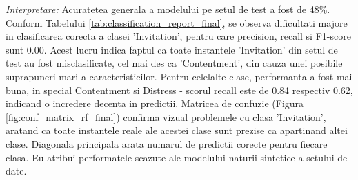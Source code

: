 \documentclass[11pt, a4paper]{article}
\begin{document}
\textit{Interpretare:} Acuratetea generala a modelului pe setul de test a fost de 48\%.
Conform Tabelului \ref{tab:classification_report_final}, se observa dificultati majore in clasificarea corecta a clasei 'Invitation', pentru care precision, recall si F1-score sunt 0.00. Acest lucru indica faptul ca toate instantele 'Invitation' din setul de test au fost misclasificate, cel mai des ca 'Contentment', din cauza unei posibile suprapuneri mari a caracteristicilor. Pentru celelalte clase, performanta a fost mai buna, in special Contentment si Distress - scorul recall este de 0.84 respectiv 0.62, indicand o incredere decenta in predictii.
Matricea de confuzie (Figura \ref{fig:conf_matrix_rf_final}) confirma vizual problemele cu clasa 'Invitation', aratand ca toate instantele reale ale acestei clase sunt prezise ca apartinand altei clase. Diagonala principala arata numarul de predictii corecte pentru fiecare clasa.
Eu atribui performatele scazute ale modelului naturii sintetice a setului de date.
\end{document}
